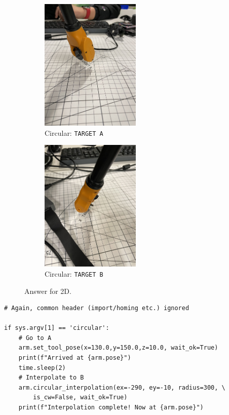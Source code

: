 \newpage
\begin{figure}[hb!]
     \centering
    \begin{subfigure}[b]{0.3\textwidth}
        \includegraphics[height=2.5in]{image/2d_circular_a.jpg}
         \caption*{Circular: \texttt{TARGET A}}
     \end{subfigure}
     \hfill
     \begin{subfigure}[b]{0.3\textwidth}
        \includegraphics[height=2.5in]{image/2d_circular_b.jpg}
         \caption*{Circular: \texttt{TARGET B}}
     \end{subfigure}
    \caption*{Answer for 2D.}
\end{figure}
%
\begin{verbatim}
# Again, common header (import/homing etc.) ignored

if sys.argv[1] == 'circular':
    # Go to A
    arm.set_tool_pose(x=130.0,y=150.0,z=10.0, wait_ok=True)
    print(f"Arrived at {arm.pose}")
    time.sleep(2)
    # Interpolate to B
    arm.circular_interpolation(ex=-290, ey=-10, radius=300, \
        is_cw=False, wait_ok=True)
    print(f"Interpolation complete! Now at {arm.pose}")
\end{verbatim}

\newpage

